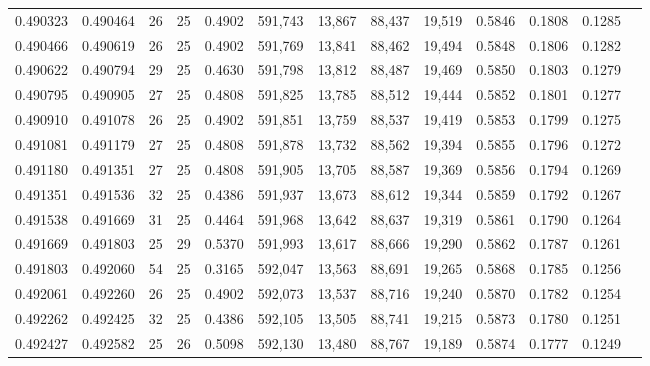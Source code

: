 \begin{tabular}{rrrrrrrrrrrrr}
0.490323 & 0.490464 &    26 &  25 &                                     0.4902 & 591,743 &  13,867 &  88,437 &  19,519 & 0.5846 & 0.1808 & 0.1285 \\
0.490466 & 0.490619 &    26 &  25 &                                     0.4902 & 591,769 &  13,841 &  88,462 &  19,494 & 0.5848 & 0.1806 & 0.1282 \\
0.490622 & 0.490794 &    29 &  25 &                                     0.4630 & 591,798 &  13,812 &  88,487 &  19,469 & 0.5850 & 0.1803 & 0.1279 \\
0.490795 & 0.490905 &    27 &  25 &                                     0.4808 & 591,825 &  13,785 &  88,512 &  19,444 & 0.5852 & 0.1801 & 0.1277 \\
0.490910 & 0.491078 &    26 &  25 &                                     0.4902 & 591,851 &  13,759 &  88,537 &  19,419 & 0.5853 & 0.1799 & 0.1275 \\
0.491081 & 0.491179 &    27 &  25 &                                     0.4808 & 591,878 &  13,732 &  88,562 &  19,394 & 0.5855 & 0.1796 & 0.1272 \\
0.491180 & 0.491351 &    27 &  25 &                                     0.4808 & 591,905 &  13,705 &  88,587 &  19,369 & 0.5856 & 0.1794 & 0.1269 \\
0.491351 & 0.491536 &    32 &  25 &                                     0.4386 & 591,937 &  13,673 &  88,612 &  19,344 & 0.5859 & 0.1792 & 0.1267 \\
0.491538 & 0.491669 &    31 &  25 &                                     0.4464 & 591,968 &  13,642 &  88,637 &  19,319 & 0.5861 & 0.1790 & 0.1264 \\
0.491669 & 0.491803 &    25 &  29 &                                     0.5370 & 591,993 &  13,617 &  88,666 &  19,290 & 0.5862 & 0.1787 & 0.1261 \\
0.491803 & 0.492060 &    54 &  25 &                                     0.3165 & 592,047 &  13,563 &  88,691 &  19,265 & 0.5868 & 0.1785 & 0.1256 \\
0.492061 & 0.492260 &    26 &  25 &                                     0.4902 & 592,073 &  13,537 &  88,716 &  19,240 & 0.5870 & 0.1782 & 0.1254 \\
0.492262 & 0.492425 &    32 &  25 &                                     0.4386 & 592,105 &  13,505 &  88,741 &  19,215 & 0.5873 & 0.1780 & 0.1251 \\
0.492427 & 0.492582 &    25 &  26 &                                     0.5098 & 592,130 &  13,480 &  88,767 &  19,189 & 0.5874 & 0.1777 & 0.1249 \\

\end{tabular}

